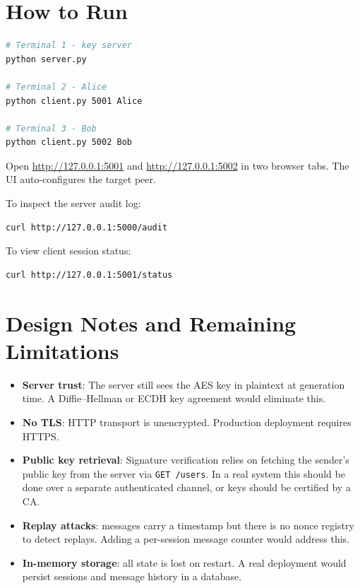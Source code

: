 \documentclass[12pt,a4paper]{article}
\begin{document}
\section{How to Run}

\begin{lstlisting}[language=bash, basicstyle=\ttfamily\small\color{codefg}]
# Terminal 1 - key server
python server.py

# Terminal 2 - Alice
python client.py 5001 Alice

# Terminal 3 - Bob
python client.py 5002 Bob
\end{lstlisting}

Open \url{http://127.0.0.1:5001} and \url{http://127.0.0.1:5002} in two browser tabs. The UI auto-configures the target peer.

To inspect the server audit log:
\begin{lstlisting}[language=bash, basicstyle=\ttfamily\small\color{codefg}]
curl http://127.0.0.1:5000/audit
\end{lstlisting}

To view client session status:
\begin{lstlisting}[language=bash, basicstyle=\ttfamily\small\color{codefg}]
curl http://127.0.0.1:5001/status
\end{lstlisting}

\section{Design Notes and Remaining Limitations}

\begin{itemize}[noitemsep]
  \item \textbf{Server trust}: The server still sees the AES key in plaintext at generation time. A Diffie--Hellman or ECDH key agreement would eliminate this.
  \item \textbf{No TLS}: HTTP transport is unencrypted. Production deployment requires HTTPS.
  \item \textbf{Public key retrieval}: Signature verification relies on fetching the sender's public key from the server via \texttt{GET /users}. In a real system this should be done over a separate authenticated channel, or keys should be certified by a CA.
  \item \textbf{Replay attacks}: messages carry a timestamp but there is no nonce registry to detect replays. Adding a per-session message counter would address this.
  \item \textbf{In-memory storage}: all state is lost on restart. A real deployment would persist sessions and message history in a database.
\end{itemize}
\end{document}
